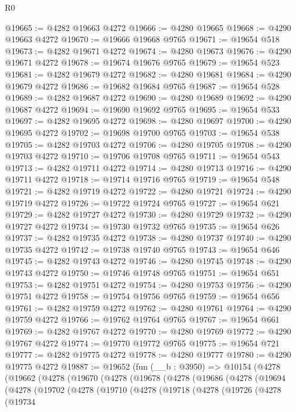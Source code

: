\begin{lexlean}{R0}
\begin{coremodule}
@19665 := @4282 @19663 @4272
@19666 := @4280 @19665
@19668 := @4290 @19663 @4272
@19670 := @19666 @19668 @9765
@19671 := @19654 @518
@19673 := @4282 @19671 @4272
@19674 := @4280 @19673
@19676 := @4290 @19671 @4272
@19678 := @19674 @19676 @9765
@19679 := @19654 @523
@19681 := @4282 @19679 @4272
@19682 := @4280 @19681
@19684 := @4290 @19679 @4272
@19686 := @19682 @19684 @9765
@19687 := @19654 @528
@19689 := @4282 @19687 @4272
@19690 := @4280 @19689
@19692 := @4290 @19687 @4272
@19694 := @19690 @19692 @9765
@19695 := @19654 @533
@19697 := @4282 @19695 @4272
@19698 := @4280 @19697
@19700 := @4290 @19695 @4272
@19702 := @19698 @19700 @9765
@19703 := @19654 @538
@19705 := @4282 @19703 @4272
@19706 := @4280 @19705
@19708 := @4290 @19703 @4272
@19710 := @19706 @19708 @9765
@19711 := @19654 @543
@19713 := @4282 @19711 @4272
@19714 := @4280 @19713
@19716 := @4290 @19711 @4272
@19718 := @19714 @19716 @9765
@19719 := @19654 @548
@19721 := @4282 @19719 @4272
@19722 := @4280 @19721
@19724 := @4290 @19719 @4272
@19726 := @19722 @19724 @9765
@19727 := @19654 @621
@19729 := @4282 @19727 @4272
@19730 := @4280 @19729
@19732 := @4290 @19727 @4272
@19734 := @19730 @19732 @9765
@19735 := @19654 @626
@19737 := @4282 @19735 @4272
@19738 := @4280 @19737
@19740 := @4290 @19735 @4272
@19742 := @19738 @19740 @9765
@19743 := @19654 @646
@19745 := @4282 @19743 @4272
@19746 := @4280 @19745
@19748 := @4290 @19743 @4272
@19750 := @19746 @19748 @9765
@19751 := @19654 @651
@19753 := @4282 @19751 @4272
@19754 := @4280 @19753
@19756 := @4290 @19751 @4272
@19758 := @19754 @19756 @9765
@19759 := @19654 @656
@19761 := @4282 @19759 @4272
@19762 := @4280 @19761
@19764 := @4290 @19759 @4272
@19766 := @19762 @19764 @9765
@19767 := @19654 @661
@19769 := @4282 @19767 @4272
@19770 := @4280 @19769
@19772 := @4290 @19767 @4272
@19774 := @19770 @19772 @9765
@19775 := @19654 @721
@19777 := @4282 @19775 @4272
@19778 := @4280 @19777
@19780 := @4290 @19775 @4272
@19887 := @19652
    (fun (__b : @3950) =>
    @10154
      (@4278
        (@19662
          (@4278
            (@19670
              (@4278
                (@19678
                  (@4278
                    (@19686
                      (@4278
                        (@19694
                          (@4278
                            (@19702
                              (@4278
                                (@19710
                                  (@4278
                                    (@19718
                                      (@4278
                                        (@19726
                                          (@4278
                                            (@19734

\end{coremodule}
\end{lexlean}
